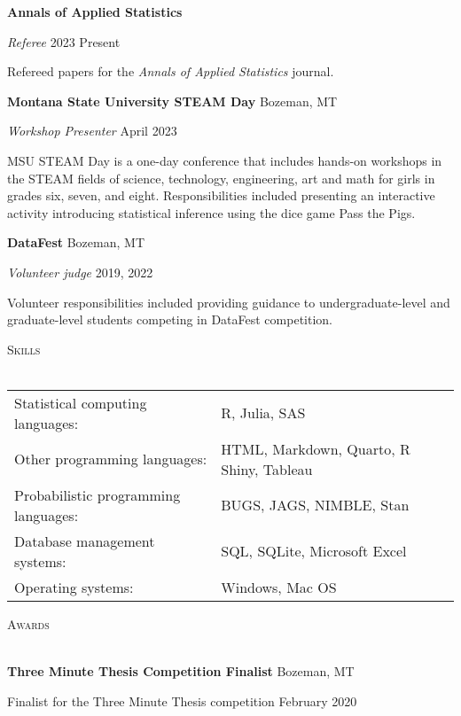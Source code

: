 \documentclass[a4paper]{article}
\newcommand{\lineunder} {
	\vspace*{-8pt} \\
	\hspace*{-18pt} \hrulefill \\
}
\newcommand{\header} [1] {
	{\hspace*{-18pt}\vspace*{6pt} \textsc{#1}}
	\vspace*{-6pt} \lineunder
}
\begin{document}
\textbf{Annals of Applied Statistics}

\emph{Referee} \hfill 2023 \textbar{} Present

Refereed papers for the \emph{Annals of Applied Statistics} journal.
\vspace*{2mm}

\newpage

\textbf{Montana State University STEAM Day} \hfill Bozeman, MT

\emph{Workshop Presenter} \hfill April 2023

MSU STEAM Day is a one-day conference that includes hands-on workshops
in the STEAM fields of science, technology, engineering, art and math
for girls in grades six, seven, and eight. Responsibilities included
presenting an interactive activity introducing statistical inference
using the dice game Pass the Pigs. \vspace*{2mm}

\textbf{DataFest} \hfill Bozeman, MT

\emph{Volunteer judge} \hfill 2019, 2022

Volunteer responsibilities included providing guidance to
undergraduate-level and graduate-level students competing in DataFest
competition. \vspace*{2mm}

\header{Skills}
\vspace*{2mm}
\begin{tabular}{ l l }
  Statistical computing languages:  & R, Julia, SAS \\
    Other programming languages:         &  HTML, Markdown, Quarto, R Shiny, Tableau \\
  Probabilistic programming languages:         & BUGS, JAGS, NIMBLE, Stan \\
    Database management systems:         & SQL, SQLite, Microsoft Excel \\
    Operating systems:       & Windows, Mac OS \\
\end{tabular}
\vspace*{2mm}

\header{Awards}
\vspace*{2mm}

\textbf{Three Minute Thesis Competition Finalist} \hfill Bozeman, MT

Finalist for the Three Minute Thesis competition \hfill February 2020

\vspace*{2mm}
\end{document}
